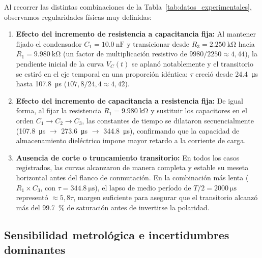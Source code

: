 Al recorrer las distintas combinaciones de la Tabla~\ref{tab:datos_experimentales}, observamos regularidades físicas muy definidas:
\begin{enumerate}
    \item \textbf{Efecto del incremento de resistencia a capacitancia fija:} Al mantener fijado el condensador $C_1 = \qty{10,0}{\nano\farad}$ y transicionar desde $R_3 = \qty{2,250}{\kilo\ohm}$ hacia $R_1 = \qty{9,980}{\kilo\ohm}$ (un factor de multiplicación resistivo de $9980/2250 \approx 4{,}44$), la pendiente inicial de la curva $V_C(t)$ se aplanó notablemente y el transitorio se estiró en el eje temporal en una proporción idéntica: $\tau$ creció desde \qty{24,4}{\micro\second} hasta \qty{107,8}{\micro\second} ($107{,}8 / 24{,}4 \approx 4{,}42$).
    \item \textbf{Efecto del incremento de capacitancia a resistencia fija:} De igual forma, al fijar la resistencia $R_1 = \qty{9,980}{\kilo\ohm}$ y sustituir los capacitores en el orden $C_1 \to C_2 \to C_3$, las constantes de tiempo se dilataron secuencialmente (\qty{107,8}{\micro\second} $\to$ \qty{273,6}{\micro\second} $\to$ \qty{344,8}{\micro\second}), confirmando que la capacidad de almacenamiento dieléctrico impone mayor retardo a la corriente de carga.
    \item \textbf{Ausencia de corte o truncamiento transitorio:} En todos los casos registrados, las curvas alcanzaron de manera completa y estable su meseta horizontal antes del flanco de conmutación. En la combinación más lenta ($R_1 \times C_3$, con $\tau = \qty{344,8}{\micro\second}$), el lapso de medio período de $T/2 = \qty{2000}{\micro\second}$ representó $\approx 5{,}8\tau$, margen suficiente para asegurar que el transitorio alcanzó más del \qty{99,7}{\percent} de saturación antes de invertirse la polaridad.
\end{enumerate}

\subsection{Sensibilidad metrológica e incertidumbres dominantes}

